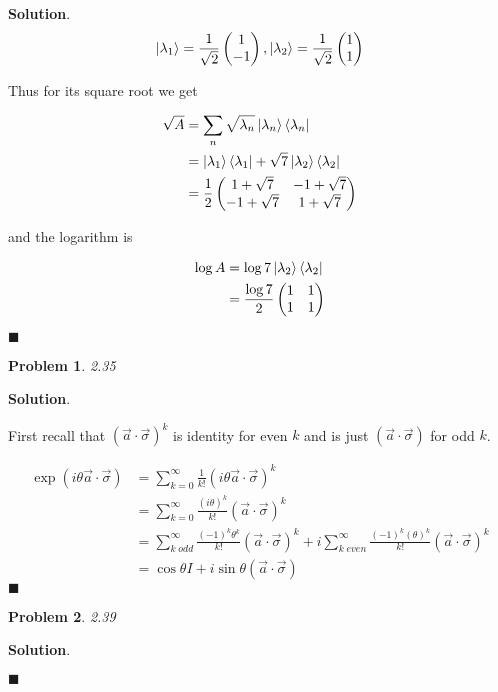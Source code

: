 \documentclass[12pt]{article}
\newtheorem{p}{Problem}
\theoremstyle{definition}
\newenvironment{s}{%
        \begin{trivlist} \item \textbf{Solution}. }{%
            \hspace*{\fill} $\blacksquare$\end{trivlist}}%
\begin{document}
{\begin{s}
\begin{equation*}
\ket{\lambda_{1}} = \frac{1}{\sqrt{2}}\begin{pmatrix}1\\-1\end{pmatrix}, \ket{\lambda_{2}} = \frac{1}{\sqrt{2}}\begin{pmatrix}1\\1\end{pmatrix} 
\end{equation*}

Thus for its square root we get

\begin{align*}
\sqrt{A} &= \sum_{n}\sqrt{\lambda_{n}}\ket{\lambda_{n}}\bra{\lambda_{n}}\\
&= \ket{\lambda_{1}}\bra{\lambda_{1}} + \sqrt{7}\ket{\lambda_{2}}\bra{\lambda_{2}}\\
&= \frac{1}{2}\begin{pmatrix}1+\sqrt{7}&-1+\sqrt{7}\\-1+\sqrt{7}&1+\sqrt{7}\end{pmatrix}
\end{align*}

and the logarithm is 

\begin{align*}
\log{A} &= \log{7}\ket{\lambda_{2}}\bra{\lambda_{2}}\\
&= \frac{\log 7}{2}\begin{pmatrix}1&1\\1&1\end{pmatrix}
\end{align*}

\end{s}

\begin{p}
2.35
\end{p}

\begin{s}

First recall that $\left(\vec{a}\cdot \vec{\sigma}\right)^{k}$ is identity for even $k$ and is just $\left(\vec{a}\cdot \vec{\sigma}\right)$ for odd $k$.

\begin{align*}
\exp(i\theta\vec{a}\cdot \vec{\sigma}) &= \sum_{k=0}^{\infty}\frac{1}{k!}\left(i\theta\vec{a}\cdot \vec{\sigma}\right)^{k}\\
&=  \sum_{k=0}^{\infty}\frac{(i\theta)^{k}}{k!}\left(\vec{a}\cdot \vec{\sigma}\right)^{k}\\
&= \sum_{k \;odd}^{\infty}\frac{(-1)^{k}\theta^{k}}{k!}\left(\vec{a}\cdot \vec{\sigma}\right)^{k} + i\sum_{k \;even}^{\infty}\frac{(-1)^{k}(\theta)^{k}}{k!}\left(\vec{a}\cdot \vec{\sigma}\right)^{k}\\
&= \cos\theta I + i\sin\theta(\vec{a}\cdot\vec{\sigma})
\end{align*}
\end{s}

\begin{p}
2.39
\end{p}

\begin{s}

\end{s}
\end{document}
